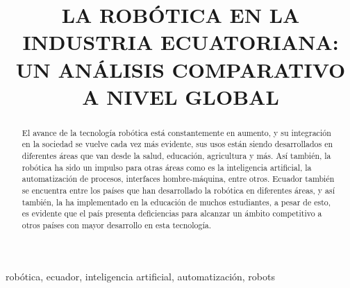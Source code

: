 \documentclass[conference]{IEEEtran}
\begin{document}
\title{LA ROBÓTICA EN LA INDUSTRIA ECUATORIANA: UN ANÁLISIS COMPARATIVO A NIVEL GLOBAL\\
}

\author{
\and
{}
\and
{}
}

\maketitle

\begin{abstract}
El avance de la tecnología robótica está constantemente en aumento, y su integración en la sociedad se vuelve cada vez más evidente, sus usos están siendo desarrollados en diferentes áreas que van desde la salud, educación, agricultura y más. Así también, la robótica ha sido un impulso para otras áreas como es la inteligencia artificial, la automatización de procesos, interfaces hombre-máquina, entre otros.
Ecuador también se encuentra entre los países que han desarrollado la robótica en diferentes áreas, y así también, la ha implementado en la educación de muchos estudiantes, a pesar de esto, es evidente que el país presenta deficiencias para alcanzar un ámbito competitivo a otros países con mayor desarrollo en esta tecnología.

\end{abstract}

\begin{IEEEkeywords}
robótica, ecuador, inteligencia artificial, automatización, robots
\end{IEEEkeywords}
\end{document}
